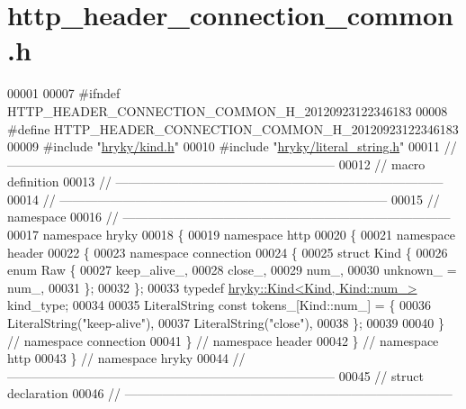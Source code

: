 \hypertarget{http__header__connection__common_8h_source}{\section{http\-\_\-header\-\_\-connection\-\_\-common.\-h}
}

\begin{DoxyCode}
00001 
00007 \textcolor{preprocessor}{#ifndef HTTP\_HEADER\_CONNECTION\_COMMON\_H\_20120923122346183}
00008 \textcolor{preprocessor}{}\textcolor{preprocessor}{#define HTTP\_HEADER\_CONNECTION\_COMMON\_H\_20120923122346183}
00009 \textcolor{preprocessor}{}\textcolor{preprocessor}{#include "\hyperlink{kind_8h}{hryky/kind.h}"}
00010 \textcolor{preprocessor}{#include "\hyperlink{literal__string_8h}{hryky/literal_string.h}"}
00011 \textcolor{comment}{//
      ------------------------------------------------------------------------------}
00012 \textcolor{comment}{// macro definition}
00013 \textcolor{comment}{//
      ------------------------------------------------------------------------------}
00014 \textcolor{comment}{//
      ------------------------------------------------------------------------------}
00015 \textcolor{comment}{// namespace}
00016 \textcolor{comment}{//
      ------------------------------------------------------------------------------}
00017 \textcolor{keyword}{namespace }hryky
00018 \{
00019 \textcolor{keyword}{namespace }http
00020 \{
00021 \textcolor{keyword}{namespace }header
00022 \{
00023 \textcolor{keyword}{namespace }connection
00024 \{
00025     \textcolor{keyword}{struct }Kind \{
00026         \textcolor{keyword}{enum} Raw \{
00027             keep\_alive\_,
00028             close\_,
00029             num\_,
00030             unknown\_ = num\_,
00031         \};
00032     \};
00033     \textcolor{keyword}{typedef} \hyperlink{classhryky_1_1_kind}{hryky::Kind<Kind, Kind::num_>} kind\_type;
00034 
00035     LiteralString \textcolor{keyword}{const} tokens\_[Kind::num\_] = \{
00036         LiteralString(\textcolor{stringliteral}{"keep-alive"}),
00037         LiteralString(\textcolor{stringliteral}{"close"}),
00038     \};
00039 
00040 \} \textcolor{comment}{// namespace connection}
00041 \} \textcolor{comment}{// namespace header}
00042 \} \textcolor{comment}{// namespace http}
00043 \} \textcolor{comment}{// namespace hryky}
00044 \textcolor{comment}{//
      ------------------------------------------------------------------------------}
00045 \textcolor{comment}{// struct declaration}
00046 \textcolor{comment}{//
      ------------------------------------------------------------------------------}

\end{DoxyCode}
